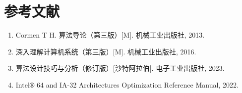 \documentclass[UTF8]{article}
\begin{document}
\section*{参考文献}
\begin{enumerate}
    \item Cormen T H. 算法导论（第三版）[M]. 机械工业出版社, 2013.
    \item 深入理解计算机系统（第三版）[M]. 机械工业出版社, 2016.
    \item 算法设计技巧与分析（修订版）[沙特阿拉伯]. 电子工业出版社, 2023.
    \item Intel® 64 and IA-32 Architectures Optimization Reference Manual, 2022.
\end{enumerate}
\end{document}
